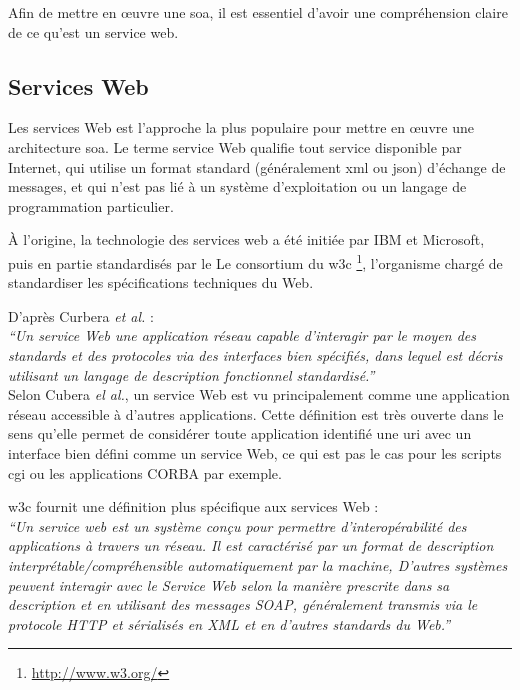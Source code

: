   Afin de mettre en œuvre une \acrshort{soa}, il est essentiel d'avoir
  une compréhension claire de ce qu’est un service web.

  \newpage
  \subsection{Services Web}
  \label{sec:ws-def}
  Les services Web est l'approche la plus populaire pour mettre en
  œuvre une architecture \acrshort{soa}. Le terme service Web qualifie
  tout service disponible par Internet, qui utilise un format standard
  (généralement \acrshort{xml} ou \acrshort{json}) d'échange de
  messages, et qui n'est pas lié à un système d'exploitation ou un
  langage de programmation particulier.

  À l'origine, la technologie des services web a été initiée par IBM
  \cite{kreger2001web} et Microsoft, puis en partie standardisés par
  le Le consortium du \acrshort{w3c}
  \footnote{\url{http://www.w3.org/}}, l'organisme chargé de
  standardiser les spécifications techniques du Web.

  D'après Curbera \emph{et al.} \cite{curbera2001web}:\\

  \textit{``Un service Web une application réseau capable d'interagir
    par le moyen des standards et des protocoles via des interfaces
    bien spécifiés, dans lequel est décris utilisant un langage de
    description fonctionnel standardisé.''}\\

  Selon Cubera \emph{el al.}, un service Web est vu principalement
  comme une application réseau accessible à d'autres
  applications. Cette définition est très ouverte dans le sens qu'elle
  permet de considérer toute application identifié une \acrshort{uri}
  avec un interface bien défini comme un service Web, ce qui est pas
  le cas pour les scripts \acrshort{cgi} ou les applications CORBA par
  exemple.

  \acrshort{w3c} fournit une définition plus spécifique aux services
  Web \cite{WSA}:\\

  \textit{``Un service web est un système conçu pour permettre
    d'interopérabilité des applications à travers un réseau.  Il est
    caractérisé par un format de description
    interprétable/compréhensible automatiquement par la machine,
    D'autres systèmes peuvent interagir avec le Service Web selon la
    manière prescrite dans sa description et en utilisant des messages
    SOAP, généralement transmis via le protocole HTTP et sérialisés en
    XML et en d'autres standards du Web.''}\\

